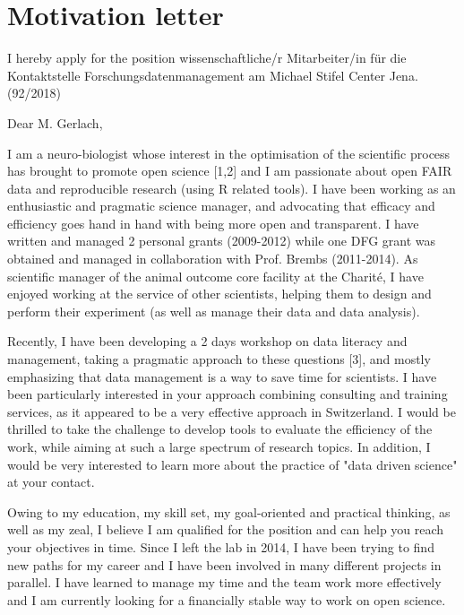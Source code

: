 \section* {Motivation letter}

I hereby apply for the position wissenschaftliche/r Mitarbeiter/in f\"{u}r die Kontaktstelle Forschungsdatenmanagement am Michael Stifel Center Jena. (92/2018)

\vspace {0.5cm} 

Dear M. Gerlach,

I am a neuro-biologist whose interest in the optimisation of the scientific process has brought to promote open science [1,2] and I am passionate about open FAIR data and reproducible research (using R related tools). I have been working as an enthusiastic and pragmatic science manager, and advocating that efficacy and efficiency goes hand in hand with being more open and transparent.
%
I have written and managed 2 personal grants (2009-2012) while one DFG grant was obtained and managed in collaboration with Prof. Brembs (2011-2014). As scientific manager of the animal outcome core facility at the Charit\'{e}, I have enjoyed working at the service of other scientists, helping them to design and perform their experiment (as well as manage their data and data analysis).

Recently, I have been developing a 2 days workshop on data literacy and management, taking a pragmatic approach to these questions [3], and mostly emphasizing that data management is a way to save  time for scientists. I have been particularly interested in your approach combining consulting and training services, as it appeared to be a very effective approach in Switzerland. 
%
 I would be thrilled to take the challenge to develop tools to evaluate the efficiency of the work, while aiming at such a large spectrum of research topics. In addition, I would be very interested to learn more about the practice of "data driven science" at your contact. 

Owing to my education, my skill set, my goal-oriented and practical thinking, as well as my zeal, I believe I am qualified for the position and can help you reach your objectives in time.
Since I left the lab in 2014, I have been trying to find new paths for my career and I have been involved in many different projects in parallel. I have learned to manage my time and the team work more effectively and I am currently looking for a financially stable way to work on open science. 

